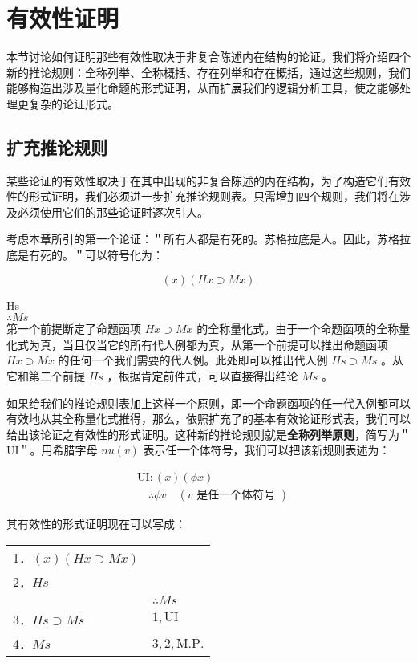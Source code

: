 \section{有效性证明}

\begin{logicbox}[title=引言]
本节讨论如何证明那些有效性取决于非复合陈述内在结构的论证。我们将介绍四个新的推论规则：全称列举、全称概括、存在列举和存在概括，通过这些规则，我们能够构造出涉及量化命题的形式证明，从而扩展我们的逻辑分析工具，使之能够处理更复杂的论证形式。
\end{logicbox}

\subsection{扩充推论规则}

某些论证的有效性取决于在其中出现的非复合陈述的内在结构，为了构造它们有效性的形式证明，我们必须进一步扩充推论规则表。只需增加四个规则，我们将在涉及必须使用它们的那些论证时逐次引人。

考虑本章所引的第一个论证：＂所有人都是有死的。苏格拉底是人。因此，苏格拉底是有死的。＂可以符号化为：

$$
(x)(H x \supset M x)
$$

Hs\\
$\therefore M s$\\
第一个前提断定了命题函项 $H x \supset M x$ 的全称量化式。由于一个命题函项的全称量化式为真，当且仅当它的所有代人例都为真，从第一个前提可以推出命题函项 $H x \supset M x$ 的任何一个我们需要的代人例。此处即可以推出代人例 $H s \supset M s$ 。从它和第二个前提 $H s$ ，根据肯定前件式，可以直接得出结论 $M s$ 。

如果给我们的推论规则表加上这样一个原则，即一个命题函项的任一代入例都可以有效地从其全称量化式推得，那么，依照扩充了的基本有效论证形式表，我们可以给出该论证之有效性的形式证明。这种新的推论规则就是\textbf{全称列举原则}，简写为＂UI＂。用希腊字母 $n u(v)$ 表示任一个体符号，我们可以把该新规则表述为：

$$
\begin{aligned}
& \mathrm{UI}:(x)(\phi x) \\
& \quad \therefore \phi v \quad(v \text { 是任一个体符号 })
\end{aligned}
$$

其有效性的形式证明现在可以写成：

\begin{center}
\begin{tabular}{ll}
1．$(x)(H x \supset M x)$ &  \\
2．$H s$ &  \\
 & $\therefore M s$ \\
3．$H s \supset M s$ & $1, \mathrm{UI}$ \\
4．$M s$ & $3,2, \mathrm{M} . \mathrm{P}$. \\
\end{tabular}
\end{center}

